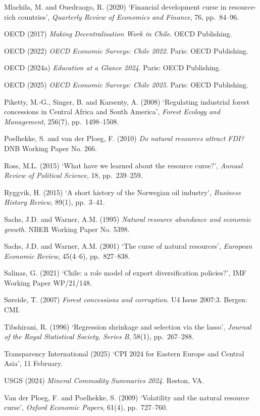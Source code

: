 \documentclass[12pt,a4paper]{report}
\begin{document}
\begin{flushleft}
Mlachila, M. and Ouedraogo, R. (2020) `Financial development curse in resource-rich countries', \textit{Quarterly Review of Economics and Finance}, 76, pp.~84--96.

OECD (2017) \textit{Making Decentralisation Work in Chile}. OECD Publishing.

OECD (2022) \textit{OECD Economic Surveys: Chile 2022}. Paris: OECD Publishing.

OECD (2024a) \textit{Education at a Glance 2024}. Paris: OECD Publishing.

OECD (2025) \textit{OECD Economic Surveys: Chile 2025}. Paris: OECD Publishing.

Piketty, M.-G., Singer, B. and Karsenty, A. (2008) `Regulating industrial forest concessions in Central Africa and South America', \textit{Forest Ecology and Management}, 256(7), pp.~1498--1508.

Poelhekke, S. and van der Ploeg, F. (2010) \textit{Do natural resources attract FDI?} DNB Working Paper No. 266.

Ross, M.L. (2015) `What have we learned about the resource curse?', \textit{Annual Review of Political Science}, 18, pp.~239--259.

Ryggvik, H. (2015) `A short history of the Norwegian oil industry', \textit{Business History Review}, 89(1), pp.~3--41.

Sachs, J.D. and Warner, A.M. (1995) \textit{Natural resource abundance and economic growth}. NBER Working Paper No. 5398.

Sachs, J.D. and Warner, A.M. (2001) `The curse of natural resources', \textit{European Economic Review}, 45(4--6), pp.~827--838.

Salinas, G. (2021) `Chile: a role model of export diversification policies?', IMF Working Paper WP/21/148.

S{\o}reide, T. (2007) \textit{Forest concessions and corruption}. U4 Issue 2007:3. Bergen: CMI.

Tibshirani, R. (1996) `Regression shrinkage and selection via the lasso', \textit{Journal of the Royal Statistical Society, Series B}, 58(1), pp.~267--288.

Transparency International (2025) `CPI 2024 for Eastern Europe and Central Asia', 11 February.

USGS (2024) \textit{Mineral Commodity Summaries 2024}. Reston, VA.

Van der Ploeg, F. and Poelhekke, S. (2009) `Volatility and the natural resource curse', \textit{Oxford Economic Papers}, 61(4), pp.~727--760.


\end{flushleft}
\end{document}
